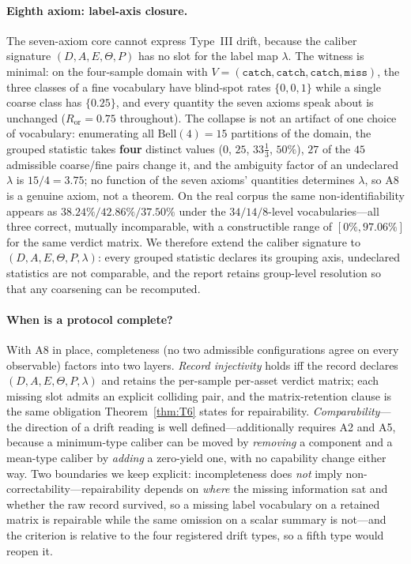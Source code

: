 \documentclass{article}
\newcommand{\catch}{\texttt{catch}}
\newcommand{\miss}{\texttt{miss}}
\begin{document}
\paragraph{Eighth axiom: label-axis closure.} The seven-axiom core cannot express Type~III drift, because
the caliber signature $(D,A,E,\Theta,P)$ has no slot for the label map $\lambda$. The witness is minimal: on
the four-sample domain with $V=(\catch,\catch,\catch,\miss)$, the three classes of a fine vocabulary have
blind-spot rates $\{0,0,1\}$ while a single coarse class has $\{0.25\}$, and every quantity the seven axioms
speak about is unchanged ($R_{\text{or}}=0.75$ throughout). The collapse is not an artifact of one choice of
vocabulary: enumerating all $\mathrm{Bell}(4)=15$ partitions of the domain, the grouped statistic takes
\textbf{four} distinct values ($0$, $25$, $33\frac{1}{3}$, $50\%$), $27$ of the $45$ admissible coarse/fine
pairs change it, and the ambiguity factor of an undeclared $\lambda$ is $15/4=3.75$; no function of the
seven axioms' quantities determines $\lambda$, so A8 is a genuine axiom, not a theorem. On the real corpus
the same non-identifiability appears as $38.24\%/42.86\%/37.50\%$ under the $34/14/8$-level vocabularies---all
three correct, mutually incomparable, with a constructible range of $[0\%,97.06\%]$ for the same verdict
matrix. We therefore extend the caliber signature to $(D,A,E,\Theta,P,\lambda)$: every grouped statistic
declares its grouping axis, undeclared statistics are not comparable, and the report retains group-level
resolution so that any coarsening can be recomputed.

\paragraph{When is a protocol complete?} With A8 in place, completeness (no two admissible configurations
agree on every observable) factors into two layers. \emph{Record injectivity} holds iff the record declares
$(D,A,E,\Theta,P,\lambda)$ and retains the per-sample per-asset verdict matrix; each missing slot admits an
explicit colliding pair, and the matrix-retention clause is the same obligation Theorem~\ref{thm:T6} states
for repairability. \emph{Comparability}---the direction of a drift reading is well defined---additionally
requires A2 and A5, because a minimum-type caliber can be moved by \emph{removing} a component and a
mean-type caliber by \emph{adding} a zero-yield one, with no capability change either way. Two boundaries
we keep explicit: incompleteness does \emph{not} imply non-correctability---repairability depends on
\emph{where} the missing information sat and whether the raw record survived, so a missing label vocabulary
on a retained matrix is repairable while the same omission on a scalar summary is not---and the criterion is
relative to the four registered drift types, so a fifth type would reopen it.
\end{document}
